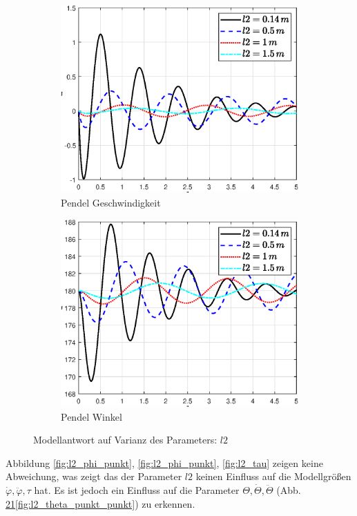 \begin{figure}
    \begin{subfigure}[b]{0.49\linewidth}
        \includegraphics[width=\linewidth]{Bilder/5_sensi/fig/l2/theta_punkt.eps}
        \caption{Pendel Geschwindigkeit}
        \label{fig:l2_theta_punkt}      
    \end{subfigure}
    \begin{subfigure}[b]{0.49\linewidth}
        \includegraphics[width=\linewidth]{Bilder/5_sensi/fig/l2/theta.eps}
        \caption{Pendel Winkel}
        \label{fig:l2_theta}
    \end{subfigure}
        \caption{Modellantwort auf Varianz des Parameters: $l2$}
        \label{fig:l2}
\end{figure}
Abbildung \ref{fig:l2_phi_punkt}, \ref{fig:l2_phi_punkt}, \ref{fig:l2_tau} zeigen keine Abweichung, was zeigt das der Parameter $l2$ keinen Einfluss auf die Modellgrößen $\dot\varphi,\ddot\varphi,\tau$ hat.
Es ist jedoch ein Einfluss auf die Parameter $\Theta,\dot\Theta,\ddot\Theta$ (Abb. \ref{fig:l2_theta}\ref{fig:l2_theta_punkt}\ref{fig:l2_theta_punkt_punkt}) zu erkennen. 

